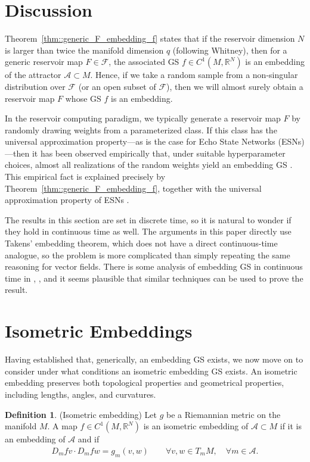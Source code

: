 \documentclass{article}
\theoremstyle{definition}
\newtheorem{defn}[theorem]{Definition}
\theoremstyle{definition}
\numberwithin{theorem}{section}
\begin{document}
\section{Discussion}

Theorem~\ref{thm::generic_F_embedding_f} states that if the reservoir 
dimension $N$ is larger than twice the manifold dimension $q$ (following Whitney), then for 
a generic reservoir map $F \in \mathcal{F}$, the associated GS 
$f \in C^1(M,\mathbb{R}^N)$ is an embedding of the attractor 
$\mathcal{A} \subset M$. Hence, if we take a random sample from a 
non-singular distribution over $\mathcal{F}$ (or an open subset of 
$\mathcal{F}$), then we will almost surely obtain a reservoir map $F$ 
whose GS $f$ is an embedding.

In the reservoir computing paradigm, we typically generate a reservoir 
map $F$ by randomly drawing weights from a parameterized class. If this 
class has the universal approximation property—as is the case for 
Echo State Networks (ESNs)—then it has been observed empirically that, 
under suitable hyperparameter choices, almost all realizations of the 
random weights yield an embedding GS 
\cite{Haluszczynski2019,Gauthier2021,Wikner2021}. 
This empirical fact is explained precisely by 
Theorem~\ref{thm::generic_F_embedding_f}, together with the universal 
approximation property of ESNs 
\cite{GrigoryevaOrtega2018}.

The results in this section are set in discrete time, so it is natural to wonder if they hold in continuous time as well. The arguments in this paper directly use Takens' embedding theorem, which does not have a direct continuous-time analogue, so the problem is more complicated than simply repeating the same reasoning for vector fields. There is some analysis of embedding GS in continuous time in \cite{Hart2024}, \cite{wong2024contraction}, and it seems plausible that similar techniques can be used to prove the result.

\section{Isometric Embeddings}

Having established that, generically, an embedding GS exists, we now move on to consider under what conditions an isometric embedding GS exists.
An isometric embedding preserves both topological properties and geometrical properties, including lengths, angles, and curvatures.

\begin{defn}
    (Isometric embedding) Let $g$ be a Riemannian metric on the manifold $M$. A map $f \in C^1(M,\mathbb{R}^N)$ is an isometric embedding of $\mathcal{A} \subset M$ if it is an embedding of $\mathcal{A}$ and if
    \begin{align*}
        D_mf v \cdot D_mf w = g_m(v,w) \qquad \forall v,w \in T_m M, \quad \forall m \in \mathcal{A}.
    \end{align*}
\end{defn}
\end{document}
